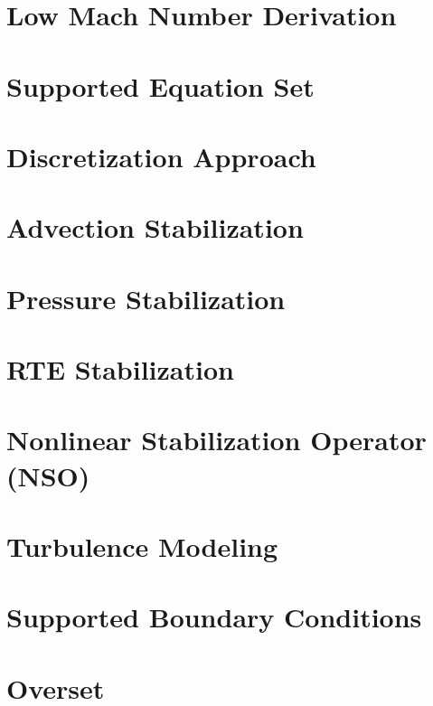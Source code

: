 \documentclass[12pt]{report}
\begin{document}
\section{Low Mach Number Derivation}


\section{Supported Equation Set}


\section{Discretization Approach}


\section{Advection Stabilization}


\section{Pressure Stabilization}


\section{RTE Stabilization}


\section{Nonlinear Stabilization Operator (NSO)}


\section{Turbulence Modeling}


\section{Supported Boundary Conditions}


\section{Overset}

\end{document}
